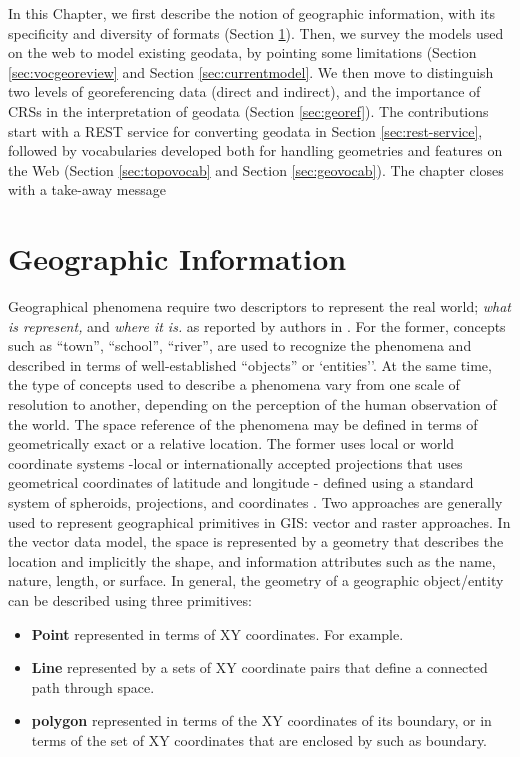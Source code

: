 In this Chapter, we first describe the notion of geographic information, with its specificity and diversity of formats (Section \ref{sec:geointro}). Then, we survey the models used on the web to model existing geodata, by pointing some limitations (Section \ref{sec:vocgeoreview} and Section \ref{sec:currentmodel}. We then move to distinguish two levels of georeferencing data (direct and indirect), and the importance of CRSs in the interpretation of geodata (Section \ref{sec:georef}). The contributions start with a REST service for converting geodata in Section \ref{sec:rest-service}, followed by vocabularies developed both for handling geometries and features on the Web (Section \ref{sec:topovocab} and Section \ref{sec:geovocab}). The chapter closes with a take-away message



\section{Geographic Information}
\label{sec:geointro}

Geographical phenomena require two descriptors to represent the real world; \textit{what is represent,} and \textit{where it is.} as reported by authors in \cite{burrough98}. For the former, concepts such as ``town'', ``school'', ``river'', are used to recognize the phenomena and described in terms of well-established ``objects'' or `entities''. At the same time, the type of concepts used to describe a phenomena vary from one scale of resolution to another, depending on the perception of the human observation of the world. The space reference of the phenomena may be defined in terms of geometrically exact or a relative location. The former uses local or world coordinate systems -local or internationally accepted projections that uses geometrical coordinates of latitude and longitude - defined using a standard system of spheroids, projections, and coordinates \cite{burrough98}. Two approaches are generally used to represent geographical primitives in GIS: vector and raster approaches. In the vector data model, the space is represented by a geometry that describes the location and implicitly the shape, and information attributes such as the name, nature, length, or surface. In general, the geometry of a geographic object/entity can be described using three primitives:
\begin{itemize}
\item \textbf{Point} represented in terms of XY coordinates. For example. 
\item \textbf{Line} represented by a sets of XY coordinate pairs that define a connected path through space. 
\item \textbf{polygon} represented in terms of the XY coordinates of its boundary, or in terms of the set of XY coordinates that are enclosed by such as boundary. 
\end{itemize}    

